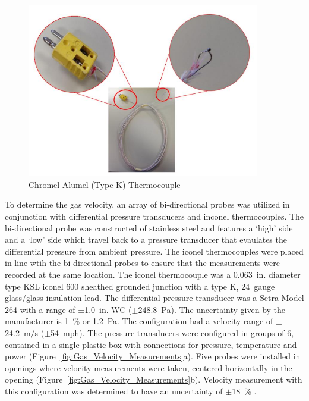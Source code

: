 \documentclass[12pt,oneside]{book}
\begin{document}
\begin{figure} [H]
	\centering
	\includegraphics[width = 4in]{0_Images/Instrumentation/Thermocouple.jpg}
	\caption{Chromel-Alumel (Type K) Thermocouple}
	\label{fig:Thermocouple}
\end{figure}

To determine the gas velocity, an array of bi-directional probes was utilized in conjunction with differential pressure transducers and inconel thermocouples. The bi-directional probe was constructed of stainless steel and features a `high' side and a `low' side which travel back to a pressure transducer that evaulates the differential pressure from ambient pressure. The iconel thermocouples were placed in-line wtih the bi-directional probes to ensure that the measurements were recorded at the same location. The iconel thermocouple was a 0.063~in. diameter type KSL iconel 600 sheathed grounded junction with a type K, 24~gauge glass/glass insulation lead. The differential pressure transducer was a Setra Model 264 with a range of ±1.0~in. WC ($\pm$248.8~Pa). The uncertainty given by the manufacturer is 1~\% or 1.2~Pa. The configuration had a velocity range of $\pm$24.2~m/s ($\pm$54~mph). The pressure transducers were configured in groups of 6, contained in a single plastic box with connections for pressure, temperature and power (Figure~\ref{fig:Gas_Velocity_Measurements}a). Five probes were installed in openings where velocity measurements were taken, centered horizontally in the opening (Figure~\ref{fig:Gas_Velocity_Measurements}b). Velocity measurement with this configuration was determined to have an uncertainty of $\pm$18~\% \cite{BDPInPoolFires}.
\end{document}
